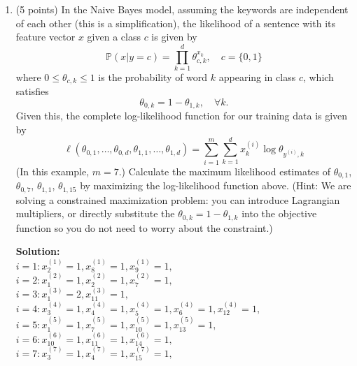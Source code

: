 \documentclass[twoside,10pt]{article}
\begin{document}
\begin{enumerate}
\begin{enumerate}
\item (5 points) In the Naive Bayes model, assuming the keywords are independent of each other (this is a simplification), the likelihood of a sentence with its feature vector $x$ given a class $c$ is given by 
\[
\mathbb P (x|y = c) = \prod_{k=1}^d \theta_{c, k}^{x_k}, \quad c = \{0, 1\}
\]
where $0 \leq \theta_{c,k} \leq 1$ is the probability of word $k$ appearing in class $c$, which satisfies 
\[\theta_{0,k} = 1- \theta_{1, k} , \quad \forall k.\] Given this, the complete log-likelihood function for our training data is given by
\[
\ell(\theta_{0,1}, \ldots, \theta_{0, d}, \theta_{1,1}, \ldots, \theta_{1, d}) = 
\sum_{i=1}^m \sum_{k=1}^d x_k^{(i)} \log \theta_{y^{(i)}, k}
\]
(In this example, $m = 7$.)
 Calculate the maximum likelihood estimates of $\theta_{0,1}$, $\theta_{0,7}$, $\theta_{1,1}$, $\theta_{1,15}$ by maximizing the log-likelihood function above.
 (Hint: We are solving a constrained maximization problem: you can introduce Lagrangian multipliers, or directly substitute the $\theta_{0,k} = 1- \theta_{1, k}$ into the objective function so you do not need to worry about the constraint.)
\begin{tcolorbox}
\textbf{Solution:}\\
$ i =  1  : x^{(1)}_{2} = 1, x^{(1)}_{8} = 1, x^{(1)}_{9} = 1, $\\

$ i =  2  : x^{(2)}_{1} = 1, x^{(2)}_{2} = 1, x^{(2)}_{7} = 1, $\\

$ i =  3  : x^{(3)}_{1} = 2, x^{(3)}_{11} = 1, $\\

$ i =  4  : x^{(4)}_{3} = 1, x^{(4)}_{4} = 1, x^{(4)}_{5} = 1, x^{(4)}_{6} = 1, x^{(4)}_{12} = 1, $\\

$ i =  5  : x^{(5)}_{1} = 1, x^{(5)}_{7} = 1, x^{(5)}_{10} = 1, x^{(5)}_{13} = 1, $\\

$ i =  6  : x^{(6)}_{10} = 1, x^{(6)}_{11} = 1, x^{(6)}_{14} = 1, $\\

$ i =  7  : x^{(7)}_{3} = 1, x^{(7)}_{4} = 1, x^{(7)}_{15} = 1, $\\


\end{tcolorbox}
\end{enumerate}
\end{enumerate}
\end{document}
